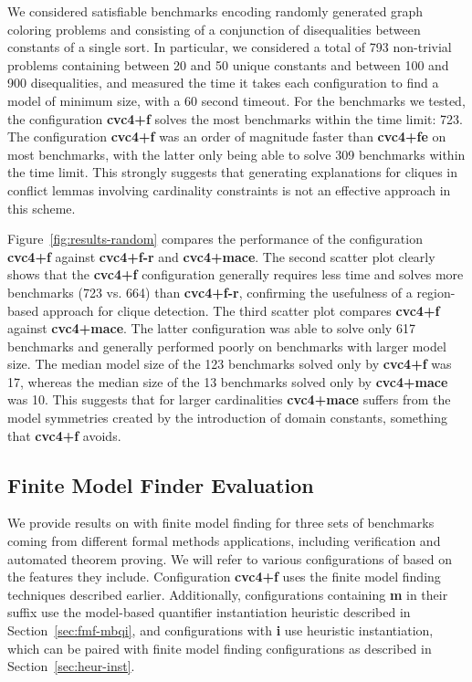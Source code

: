 \documentclass{svjour3}                     %
\begin{document}
We considered satisfiable benchmarks encoding randomly generated 
graph coloring problems and consisting of a conjunction of disequalities 
between constants of a single sort.
In particular, we considered a total of 793 non-trivial problems containing 
between 20 and 50 unique constants and between 100 and 900 disequalities, and 
measured the time it takes each configuration to find a model of minimum size,
with a 60 second timeout.
For the benchmarks we tested, 
the configuration {\bf cvc4+f} solves the most benchmarks 
within the time limit: 723.
The configuration {\bf cvc4+f} was an order of magnitude faster than {\bf cvc4+fe} on most benchmarks,
with the latter only being able to solve 309 benchmarks within the time limit.
This strongly suggests that generating explanations for cliques 
in conflict lemmas involving cardinality constraints is not
an effective approach in this scheme.

Figure~\ref{fig:results-random} compares the performance of the configuration {\bf cvc4+f} against {\bf cvc4+f-r} and {\bf cvc4+mace}.
The second scatter plot clearly shows that 
the {\bf cvc4+f} configuration generally requires less time and 
solves more benchmarks (723 vs. 664) 
than {\bf cvc4+f-r}, confirming the usefulness 
of a region-based approach for clique detection.
The third scatter plot compares {\bf cvc4+f} against {\bf cvc4+mace}.
The latter configuration was able to solve only 617 benchmarks and
generally performed poorly on benchmarks with larger model size.
The median model size of the 123 benchmarks solved only 
by {\bf cvc4+f} was 17, 
whereas the median size of the 13 benchmarks solved only by {\bf cvc4+mace} 
was 10.
This suggests that  for larger cardinalities {\bf cvc4+mace} suffers 
from the model symmetries created by the introduction of domain constants, 
something that {\bf cvc4+f} avoids.

\subsection{Finite Model Finder Evaluation}\label{sec:results-fmf}

We provide results on \cvc with finite model finding 
for three sets of benchmarks coming from different formal methods applications,
including verification and automated theorem proving.
We will refer to various configurations of \cvc
based on the features they include.
Configuration {\bf cvc4+f} uses the finite model finding techniques described earlier.
Additionally, configurations containing {\bf m} in their suffix use the model-based quantifier instantiation
heuristic described in Section~\ref{sec:fmf-mbqi},
and configurations with {\bf i} use heuristic instantiation,
which can be paired with finite model finding configurations as described in Section~\ref{sec:heur-inst}.
\end{document}
